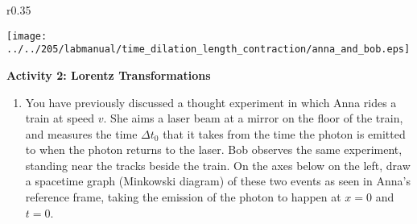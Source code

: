 \begin{wrapfigure}[8]{r}{0.35\textwidth}
\begin{center}
\texttt{[image: ../../205/labmanual/time\_dilation\_length\_contraction/anna\_and\_bob.eps]}
\end{center}
\end{wrapfigure}


\textbf{Activity 2: Lorentz Transformations}


\begin{enumerate}[labparts]

\item  
You have previously discussed a thought experiment in which Anna rides a train at speed $v$.  She aims a laser beam at a mirror on the floor of the train, and measures the time $\Delta t_0$ that it takes from the time the photon is emitted to when the photon returns to the laser.  Bob observes the same experiment, standing near the tracks beside the train.  On the axes below on the left, draw a spacetime graph (Minkowski diagram) of these two events as seen in Anna's reference frame, taking the emission of the photon to happen at $x=0$ and $t=0$.
\end{enumerate}


